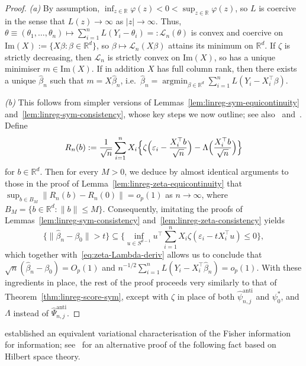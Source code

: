 \documentclass[a4paper]{article}
\newcommand{\R}{\mathbb{R}}
\newcommand{\norm}[1]{\|{#1}\|}
\DeclareMathOperator*{\argmin}{argmin}
\theoremstyle{definition}
\begin{document}
\begin{proof}
\textit{(a)} By assumption, $\inf_{z \in \R}\varphi(z) < 0 < \sup_{z \in \R}\varphi(z)$, so $L$ is coercive in the sense that $L(z) \to \infty$ as $|z| \to \infty$. Thus, $\theta \equiv (\theta_1,\dotsc,\theta_n) \mapsto \sum_{i=1}^n L(Y_i - \theta_i) =: \mathcal{L}_n(\theta)$ is convex and coercive on $\mathrm{Im}(X) := \{X\beta : \beta \in \R^d\}$, so $\beta \mapsto \mathcal{L}_n(X\beta)$ attains its minimum on $\R^d$. If $\zeta$ is strictly decreasing, then $\mathcal{L}_n$ is strictly convex on $\mathrm{Im}(X)$, so has a unique minimiser $m \in \mathrm{Im}(X)$. If in addition $X$ has full column rank, then there exists a unique $\hat{\beta}_n$ such that $m = X\hat{\beta}_n$, i.e.~$\hat{\beta}_n = \argmin_{\beta \in \R^d} \sum_{i=1}^n L(Y_i - X_i^\top\beta)$.

\medskip
\noindent
\textit{(b)} This follows from simpler versions of Lemmas~\ref{lem:linreg-sym-equicontinuity} and~\ref{lem:linreg-sym-consistency}, whose key steps we now outline; see also~\citet[Lemma~4.1]{bickel1975one} and~\citet[Theorem~2.1]{he2000parameters}. Define
\[
R_n(b) := \frac{1}{\sqrt{n}}\sum_{i=1}^n X_i\Bigl\{\zeta\Bigl(\varepsilon_i - \frac{X_i^\top b}{\sqrt{n}}\Bigr) - \Lambda\Bigl(\frac{X_i^\top b}{\sqrt{n}}\Bigr)\Bigr\}
\]
for $b \in \R^d$. Then for every $M > 0$, we deduce by almost identical arguments to those in the proof of Lemma~\ref{lem:linreg-zeta-equicontinuity} that $\sup_{b \in B_M} \norm{R_n(b) - R_n(0)} = o_p(1)$ as $n \to \infty$, where $B_M = \{b \in \R^d : \norm{b} \leq M\}$. Consequently, imitating the proofs of Lemmas~\ref{lem:linreg-sym-consistency} and~\ref{lem:linreg-zeta-consistency} yields
\[
\bigl\{\norm{\hat{\beta}_n - \beta_0} > t\bigr\} \subseteq \biggl\{\inf_{u \in S^{d-1}}u^\top \sum_{i=1}^n X_i\zeta(\varepsilon_i - tX_i^\top u) \leq 0\biggr\},
\]
which together with~\eqref{eq:zeta-Lambda-deriv} allows us to conclude that $\sqrt{n}(\hat{\beta}_n - \beta_0) = O_p(1)$ and $n^{-1/2}\sum_{i=1}^n L(Y_i - X_i^\top\hat{\beta}_n) = o_p(1)$. With these ingredients in place, the rest of the proof proceeds very similarly to that of Theorem~\ref{thm:linreg-score-sym}, except with $\zeta$ in place of both $\hat{\psi}_{n,j}^{\mathrm{anti}}$ and $\psi_0^*$, and $\Lambda$ instead of $\hat{\Psi}_{n,j}^{\mathrm{anti}}$.
\end{proof}

\citet[Theorem~3]{huber1964robust} established an equivalent variational characterisation of the Fisher information for information; see~\citet[Theorem~4.2]{huber2009robust} for an alternative proof of the following fact based on Hilbert space theory.
\end{document}
